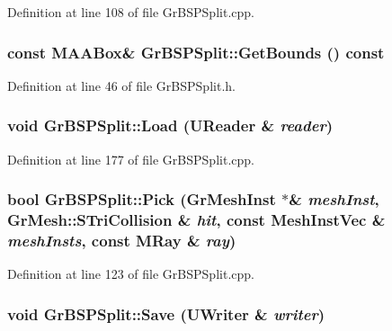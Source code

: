 Definition at line 108 of file GrBSPSplit.cpp.\hypertarget{class_gr_b_s_p_split_d350a8e48025fdad328728bd7fdd4e59}{
\subsubsection[{GetBounds}]{\setlength{\rightskip}{0pt plus 5cm}const {\bf MAABox}\& GrBSPSplit::GetBounds () const}}
\label{class_gr_b_s_p_split_d350a8e48025fdad328728bd7fdd4e59}




Definition at line 46 of file GrBSPSplit.h.\hypertarget{class_gr_b_s_p_split_126cdb20e5d6df4c722c1f6277364e89}{
\subsubsection[{Load}]{\setlength{\rightskip}{0pt plus 5cm}void GrBSPSplit::Load ({\bf UReader} \& {\em reader})}}
\label{class_gr_b_s_p_split_126cdb20e5d6df4c722c1f6277364e89}




Definition at line 177 of file GrBSPSplit.cpp.\hypertarget{class_gr_b_s_p_split_0563f3ee8c06239078f320d1bab3c6f3}{
\subsubsection[{Pick}]{\setlength{\rightskip}{0pt plus 5cm}bool GrBSPSplit::Pick ({\bf GrMeshInst} $\ast$\& {\em meshInst}, \/  {\bf GrMesh::STriCollision} \& {\em hit}, \/  const {\bf MeshInstVec} \& {\em meshInsts}, \/  const {\bf MRay} \& {\em ray})}}
\label{class_gr_b_s_p_split_0563f3ee8c06239078f320d1bab3c6f3}




Definition at line 123 of file GrBSPSplit.cpp.\hypertarget{class_gr_b_s_p_split_01c7a29e9a6a511fea57ee9e4bf53496}{
\subsubsection[{Save}]{\setlength{\rightskip}{0pt plus 5cm}void GrBSPSplit::Save ({\bf UWriter} \& {\em writer})}}
\label{class_gr_b_s_p_split_01c7a29e9a6a511fea57ee9e4bf53496}




